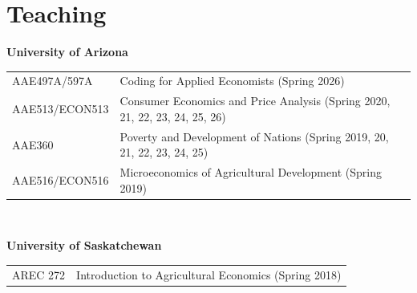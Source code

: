 \documentclass[letterpaper]{article}
\renewenvironment{itemize}{
  \begin{list}
  	{}{
    \setlength{\leftmargin}{1.5em}
    \setlength{\itemsep}{-.5em}
  }
}{
  \end{list}
}
\begin{document}
\section*{\sc Teaching}
\begin{itemize}
	\item {\bf University of Arizona} \\
	\begin{tabular}{ll}
		AAE497A/597A	& Coding for Applied Economists (Spring 2026) \\
		AAE513/ECON513	& Consumer Economics and Price Analysis (Spring 2020, 21, 22, 23, 24, 25, 26) \\
		AAE360	& Poverty and Development of Nations (Spring 2019, 20, 21, 22, 23, 24, 25) \\
		AAE516/ECON516	& Microeconomics of Agricultural Development (Spring 2019) \\
	\end{tabular}
	\\
	\leftskip 0in
	\item {\bf University of Saskatchewan} \\
	\begin{tabular}{ll}
		AREC 272	& Introduction to Agricultural Economics (Spring 2018) \\
	\end{tabular}
\end{itemize}
\end{document}

